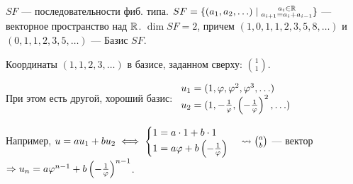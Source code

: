 \begin{example}
    $SF$ --- последовательности фиб. типа.  $SF = \{ (a_1, a_2, \ldots) \mid \substack{a_i \in \mathbb{R} \\ a_{i+1} = a_i + a_{i-1}} \} $ --- векторное пространство над $\mathbb{R}$.  $\dim SF = 2$, причем  $(1, 0, 1, 1, 2, 3, 5, 8, \ldots)$ и $(0, 1, 1, 2, 3, 5, \ldots)$ --- Базис $SF$. 

    Координаты  $(1, 1, 2, 3, \ldots)$ в базисе, заданном сверху: $\binom{1}{1}$. 

    При этом есть другой, хороший базис:  $\begin{array}{l} u_1 = (1, \varphi, \varphi^2, \varphi^3, \ldots) \\ u_2 =(1, -\frac{1}{\varphi}, \left(-\frac{1}{\varphi}\right)^2, \ldots ) \end{array}$

    Например, $u = au_1 + bu_2 \iff \begin{cases} 1 = a\cdot 1 + b\cdot1 \\ 1 = a \varphi  + b \left(-\frac{1}{\varphi}\right) \end{cases} \leadsto \binom{a}{b}$ --- вектор $\Rightarrow u_n = a \varphi^{n-1} + b \left(-\frac{1}{\varphi}\right)^{n-1}$. 
\end{example}

